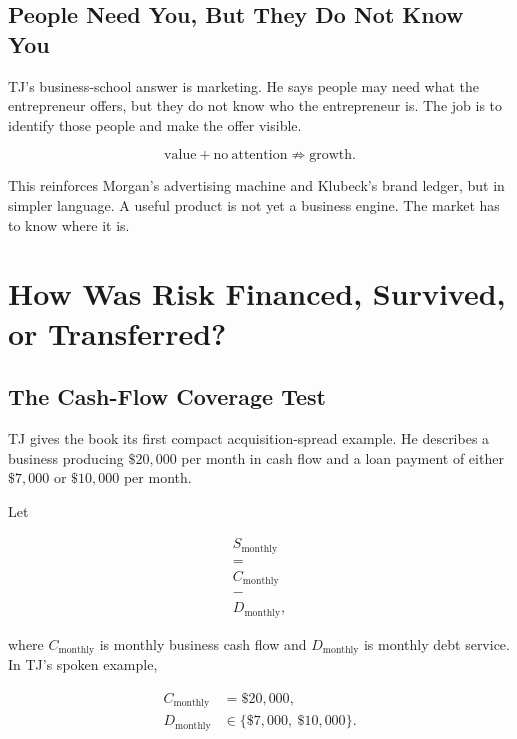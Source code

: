 \documentclass[11pt,oneside]{book}
\begin{document}
\section{People Need You, But They Do Not Know You}

TJ's business-school answer is marketing. He says people may need what the entrepreneur offers, but they do not know who the entrepreneur is. The job is to identify those people and make the offer visible.

\begin{equation}
\mathrm{value}
+
\mathrm{no\ attention}
\not\Rightarrow
\mathrm{growth}.
\end{equation}

This reinforces Morgan's advertising machine and Klubeck's brand ledger, but in simpler language. A useful product is not yet a business engine. The market has to know where it is.

\chapter{How Was Risk Financed, Survived, or Transferred?}

\section{The Cash-Flow Coverage Test}

TJ gives the book its first compact acquisition-spread example. He describes a business producing \(\$20{,}000\) per month in cash flow and a loan payment of either \(\$7{,}000\) or \(\$10{,}000\) per month.

Let

\begin{equation}
\begin{gathered}
S_{\mathrm{monthly}}\\
=\\
C_{\mathrm{monthly}}\\
-\\
D_{\mathrm{monthly}},
\end{gathered}
\end{equation}

where \(C_{\mathrm{monthly}}\) is monthly business cash flow and \(D_{\mathrm{monthly}}\) is monthly debt service. In TJ's spoken example,

\begin{align}
C_{\mathrm{monthly}} &= \$20{,}000,\\
D_{\mathrm{monthly}} &\in \{\$7{,}000,\ \$10{,}000\}.
\end{align}
\end{document}
